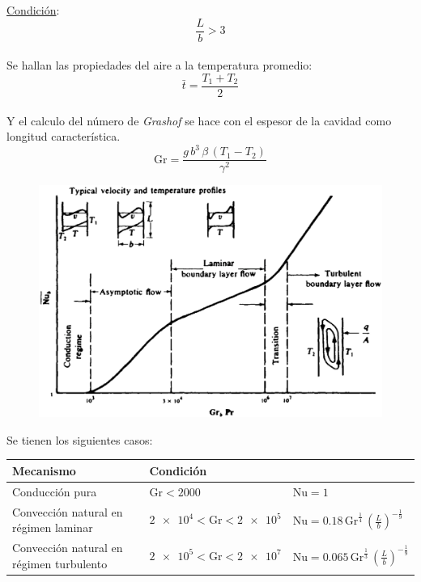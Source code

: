 \underline{Condición}:
\begin{equation*}
    \frac{L}{b} > 3
\end{equation*}
\\

Se hallan las propiedades del aire a la temperatura promedio:
\begin{equation*}
    \bar{t} = \frac{T_1 + T_2}{2}
\end{equation*}
\\

Y el calculo del número de \emph{Grashof} se hace con el espesor de la cavidad
como longitud característica.
\\
\begin{equation*}
    \text{Gr} = \frac{g\,b^3\,\beta\,(T_1 - T_2)}{\gamma^2}
\end{equation*}

\begin{figure}[!h]
\centering
\includegraphics[scale=0.32]{figura04_08.eps}
\end{figure}

Se tienen los siguientes casos:
\begin{table}[!h]
\begin{center}
\begin{tabular}{|>{\centering}m{3.8cm}<{\centering}
                |>{\centering}m{4.4cm}<{\centering}
                |>{\centering}m{4.4cm}<{\centering}|}
\hline
\textbf{Mecanismo} &
\textbf{Condición} &
\tabularnewline \hline
Conducción pura &
$\text{Gr} < 2000$ &
$\text{Nu} = 1$ \tabularnewline \hline
Convección natural en régimen laminar &
$\num{2e4} < \text{Gr} < \num{2e5}$ &
$\text{Nu} = 0.18\,\text{Gr}^{\frac{1}{4}}\,
\left(\frac{L}{b}\right)^{-\frac{1}{9}}$
\tabularnewline \hline
Convección natural en régimen turbulento &
$\num{2e5} < \text{Gr} < \num{2e7}$ &
$\text{Nu} = 0.065\,\text{Gr}^{\frac{1}{3}}\,
\left(\frac{L}{b}\right)^{-\frac{1}{9}}$
\tabularnewline \hline
\end{tabular}
\end{center}
\end{table}

